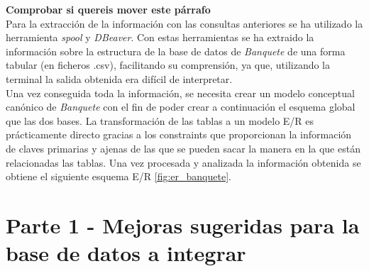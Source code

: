 \documentclass{article}
\begin{document}
\textbf{Comprobar si quereis mover este párrafo}\\
Para la extracción de la información con las consultas anteriores se ha utilizado la herramienta \emph{spool} y \emph{DBeaver}. Con estas herramientas se ha extraido la información sobre la estructura de la base de datos de \emph{Banquete} de una forma tabular (en ficheros .csv), facilitando su comprensión, ya que, utilizando la terminal la salida obtenida era difícil de interpretar.\\

Una vez conseguida toda la información, se necesita crear un modelo conceptual canónico de \emph{Banquete} con el fin de poder crear a continuación el esquema global que las dos bases. La transformación de las tablas a un modelo E/R es prácticamente directo gracias a los constraints que proporcionan la información de claves primarias y ajenas de las que se pueden sacar la manera en la que están relacionadas las tablas. Una vez procesada y analizada la información obtenida se obtiene el siguiente esquema E/R \ref{fig:er_banquete}.

\section{Parte 1 - Mejoras sugeridas para la base de datos a integrar}\label{mejoras}
\end{document}
